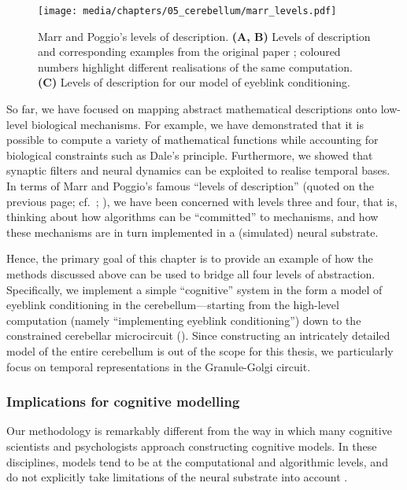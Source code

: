 
\begin{figure}
	\centering
	\texttt{[image: media/chapters/05\_cerebellum/marr\_levels.pdf]}%
	{\label{fig:marr_levels_a}}%
	{\label{fig:marr_levels_b}}%
	{\label{fig:marr_levels_c}}%
	\caption[Marr and Poggio's levels of description]{Marr and Poggio's levels of description.
	\textbf{(A, B)} Levels of description and corresponding examples from the original paper \citep{marr1976understanding}; coloured numbers highlight different realisations of the same computation.
	\textbf{(C)} Levels of description for our model of eyeblink conditioning.
	}
	\label{fig:marr_levels}
\end{figure}

So far, we have focused on mapping abstract mathematical descriptions onto low-level biological mechanisms.
For example, we have demonstrated that it is possible to compute a variety of mathematical functions while accounting for biological constraints such as Dale's principle.
Furthermore, we showed that synaptic filters and neural dynamics can be exploited to realise temporal bases.
In terms of Marr and Poggio's famous \enquote{levels of description} (quoted on the previous page; cf.~; \cite{marr1976understanding}), we have been concerned with levels three and four, that is, thinking about how algorithms can be \enquote{committed} to mechanisms, and how these mechanisms are in turn implemented in a (simulated) neural substrate.

Hence, the primary goal of this chapter is to provide an example of how the methods discussed above can be used to bridge all four levels of abstraction.
Specifically, we implement a simple \enquote{cognitive} system in the form a model of eyeblink conditioning in the cerebellum---starting from the high-level computation (namely \enquote{implementing eyeblink conditioning}) down to the constrained cerebellar microcircuit ().
Since constructing an intricately detailed model of the entire cerebellum is out of the scope for this thesis, we particularly focus on temporal representations in the Granule-Golgi circuit.

\subsubsection{Implications for cognitive modelling}
Our methodology is remarkably different from the way in which many cognitive scientists and psychologists approach constructing cognitive models.
In these disciplines, models tend to be at the computational and algorithmic levels, and do not explicitly take limitations of the neural substrate into account \citep{eliasmith2015marr}.

